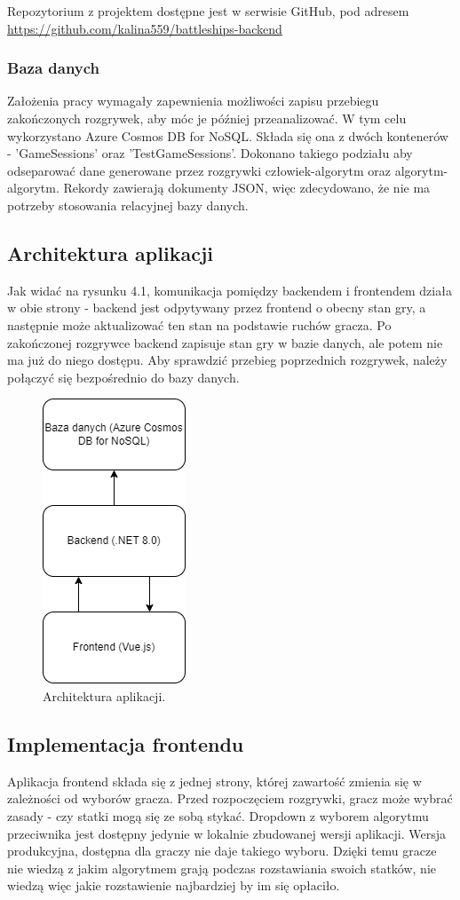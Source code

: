 \indent Repozytorium z projektem dostępne jest w serwisie GitHub, pod adresem \url{https://github.com/kalina559/battleships-backend}
\subsubsection{Baza danych}
\indent Założenia pracy wymagały zapewnienia możliwości zapisu przebiegu zakończonych rozgrywek, aby móc je później przeanalizować. W tym celu wykorzystano Azure Cosmos DB for NoSQL. Składa się ona z dwóch kontenerów - 'GameSessions' oraz 'TestGameSessions'. Dokonano takiego podziału aby odseparować dane generowane przez rozgrywki człowiek-algorytm oraz algorytm-algorytm. Rekordy zawierają dokumenty JSON, więc zdecydowano, że nie ma potrzeby stosowania relacyjnej bazy danych.

\subsection{Architektura aplikacji}
\indent Jak widać na rysunku 4.1, komunikacja pomiędzy backendem i frontendem działa w obie strony - backend jest odpytywany przez frontend o obecny stan gry, a następnie może aktualizować ten stan na podstawie ruchów gracza. Po zakończonej rozgrywce backend zapisuje stan gry w bazie danych, ale potem nie ma już do niego dostępu. Aby sprawdzić przebieg poprzednich rozgrywek, należy połączyć się bezpośrednio do bazy danych.

\begin{figure}[!h]
    \label{fig:architektura}
    \centering \includegraphics[width=0.2\linewidth]{img/architecture.drawio.png}
    \caption{Architektura aplikacji.}
\end{figure}

\subsection{Implementacja frontendu}
\indent Aplikacja frontend składa się z jednej strony, której zawartość zmienia się w zależności od wyborów gracza. Przed rozpoczęciem rozgrywki, gracz może wybrać zasady - czy statki mogą się ze sobą stykać. Dropdown z wyborem algorytmu przeciwnika jest dostępny jedynie w lokalnie zbudowanej wersji aplikacji. Wersja produkcyjna, dostępna dla graczy nie daje takiego wyboru. Dzięki temu gracze nie wiedzą z jakim algorytmem grają podczas rozstawiania swoich statków, nie wiedzą więc jakie rozstawienie najbardziej by im się opłaciło.

